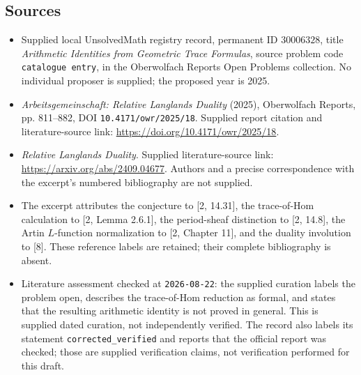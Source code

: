 \documentclass[11pt]{article}
\begin{document}
\subsection{Sources}
\begin{itemize}
\item Supplied local UnsolvedMath registry record, permanent ID \(30006328\), title \emph{Arithmetic Identities from Geometric Trace Formulas}, source problem code \texttt{catalogue entry}, in the Oberwolfach Reports Open Problems collection. No individual proposer is supplied; the proposed year is 2025.
\item \emph{Arbeitsgemeinschaft: Relative Langlands Duality} (2025), Oberwolfach Reports, pp. 811--882, DOI \texttt{10.4171/owr/2025/18}. Supplied report citation and literature-source link: \url{https://doi.org/10.4171/owr/2025/18}.
\item \emph{Relative Langlands Duality}. Supplied literature-source link: \url{https://arxiv.org/abs/2409.04677}. Authors and a precise correspondence with the excerpt's numbered bibliography are not supplied.
\item The excerpt attributes the conjecture to [2, 14.31], the trace-of-Hom calculation to [2, Lemma 2.6.1], the period-sheaf distinction to [2, 14.8], the Artin \(L\)-function normalization to [2, Chapter 11], and the duality involution to [8]. These reference labels are retained; their complete bibliography is absent.
\item Literature assessment checked at \texttt{2026-08-22}: the supplied curation labels the problem open, describes the trace-of-Hom reduction as formal, and states that the resulting arithmetic identity is not proved in general. This is supplied dated curation, not independently verified. The record also labels its statement \texttt{corrected\_verified} and reports that the official report was checked; those are supplied verification claims, not verification performed for this draft.
\end{itemize}
\end{document}

